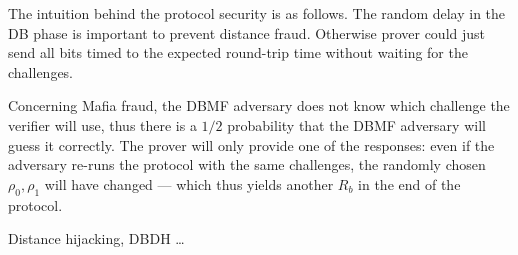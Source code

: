 The intuition behind the protocol security is as follows.
The random delay in the \ac{DB} phase is important to prevent distance fraud.
Otherwise  prover could just send all bits timed to the expected 
round-trip time without waiting for the challenges.

Concerning Mafia fraud, the \ac{DBMF} adversary does not know which challenge 
the verifier will use, thus there is a \(1/2\) probability that the \ac{DBMF} 
adversary will guess it correctly.
The prover will only provide one of the responses: even if the adversary re-runs 
the protocol with the same challenges, the randomly chosen \(\rho_0, \rho_1\) 
will have changed --- which thus yields another \(R_b\) in the end of the 
protocol.

Distance hijacking, \ac{DBDH} \dots
